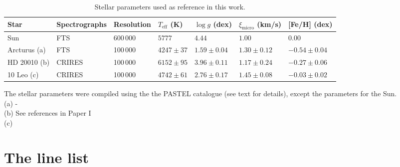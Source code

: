 \documentclass[a4paper,fleqn,usenatbib]{mnras}
\begin{document}
\begin{table}
    \caption{Stellar parameters used as reference in this work.}
    \label{tab:stars}
    \centering
    \begin{tabular}{lllllll}
      \hline\hline
        Star          & Spectrographs  & Resolution  & $T_\mathrm{eff}$ (K) &  $\log g$ (dex)  &   $\xi_\mathrm{micro}$ (km/s)   & [Fe/H] (dex)      \\
      \hline
        Sun           & FTS            & 600\,000    & $5777$               &  $4.44$          &    $1.00$                       & $ 0.00$          \\
        Arcturus (a)  & FTS            & 100\,000    & $4247 \pm  37$       &  $1.59 \pm 0.04$ &    $1.30 \pm 0.12$              & $-0.54 \pm 0.04$ \\
        HD 20010 (b)  & CRIRES         & 100\,000    & $6152 \pm  95$       &  $3.96 \pm 0.11$ &    $1.17 \pm 0.24$              & $-0.27 \pm 0.06$ \\
        10 Leo (c)    & CRIRES         & 100\,000    & $4742 \pm  61$       &  $2.76 \pm 0.17$ &    $1.45 \pm 0.08$              & $-0.03 \pm 0.02$ \\
      \hline
    \end{tabular}
    \vspace{1ex}

     \raggedright The stellar parameters were compiled using the the PASTEL catalogue \citep{Soubiran2016} (see text for details), 
     except the parameters for the Sun. \\
     (a) -  {\citet{Luck2015,Ramirez2013,Massarotti2008,McWilliam1990,Soubiran2008,Griffin1967,Gray2003,Luck2007,Sheffield2012,AllendePrieto2004,Gratton1953,Schwarzschild1957,CayrelDeStrobel1970,Maeckle1975,Penston1977,Martin1977,Oinas1977,Branch1978,Cenarro2007,Lambert1981,Gratton1982,Bell1985,Gratton1986,Kyrolainen1986,Leep1987,Edvardsson1988,FernandezVillacanas1990,Brown1992,McWilliam1994,Sneden1994,Hill1997,Gonzalez1998b,Tomkin1999,Carr2000,Frasca2009,Prugniel2011}} \\
     (b) {See references in Paper I} \\
     (c) {\citet{Park2013,Luck2015,Massarotti2008,Soubiran2008,daSilva2011}}
\end{table}


\section{The line list}
\label{sec:linelist}
\end{document}

